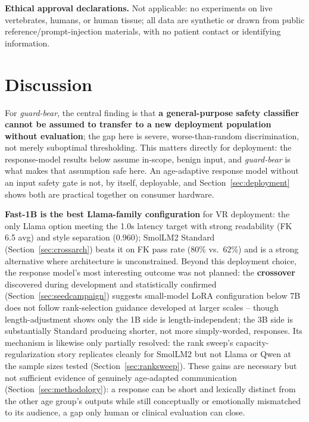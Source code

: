 \documentclass[pdflatex,sn-mathphys-num]{sn-jnl}%
\begin{document}
\textbf{Ethical approval declarations.} Not applicable: no experiments on live vertebrates, humans, or human tissue; all data are synthetic or drawn from public reference/prompt-injection materials, with no patient contact or identifying information.

\section{Discussion}\label{sec:discussion}

For \textit{guard-bear}, the central finding is that \textbf{a general-purpose safety classifier cannot be assumed to transfer to a new deployment population without evaluation}; the gap here is severe, worse-than-random discrimination, not merely suboptimal thresholding. This matters directly for deployment: the response-model results below assume in-scope, benign input, and \textit{guard-bear} is what makes that assumption safe here. An age-adaptive response model without an input safety gate is not, by itself, deployable, and Section~\ref{sec:deployment} shows both are practical together on consumer hardware.

\textbf{Fast-1B is the best Llama-family configuration} for VR deployment: the only Llama option meeting the 1.0s latency target with strong readability (FK 6.5 avg) and style separation (0.960); SmolLM2 Standard (Section~\ref{sec:crossarch}) beats it on FK pass rate (80\% vs.\ 62\%) and is a strong alternative where architecture is unconstrained. Beyond this deployment choice, the response model's most interesting outcome was not planned: the \textbf{crossover} discovered during development and statistically confirmed (Section~\ref{sec:seedcampaign}) suggests small-model LoRA configuration below 7B does not follow rank-selection guidance developed at larger scales -- though length-adjustment shows only the 1B side is length-independent; the 3B side is substantially Standard producing shorter, not more simply-worded, responses. Its mechanism is likewise only partially resolved: the rank sweep's capacity-regularization story replicates cleanly for SmolLM2 but not Llama or Qwen at the sample sizes tested (Section~\ref{sec:ranksweep}). These gains are necessary but not sufficient evidence of genuinely age-adapted communication (Section~\ref{sec:methodology}): a response can be short and lexically distinct from the other age group's outputs while still conceptually or emotionally mismatched to its audience, a gap only human or clinical evaluation can close.
\end{document}
